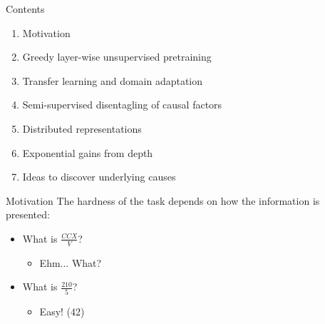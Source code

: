 
\begin{frame}{Contents}
\begin{enumerate}
  \item Motivation
  \item Greedy layer-wise unsupervised pretraining
  \item Transfer learning and domain adaptation
  \item Semi-supervised disentagling of causal factors
  \item Distributed representations
  \item Exponential gains from depth
  \item Ideas to discover underlying causes
\end{enumerate}
\end{frame}


\begin{frame}{Motivation}
The hardness of the task depends on how the information is presented:
\begin{itemize}
\item What is $\frac{CCX}{V}$?
\begin{itemize}
\item Ehm... What?
\end{itemize}
\item What is $\frac{210}{5}$?
\begin{itemize}
\item Easy! (42)
\end{itemize}
\end{itemize}

\end{frame}

